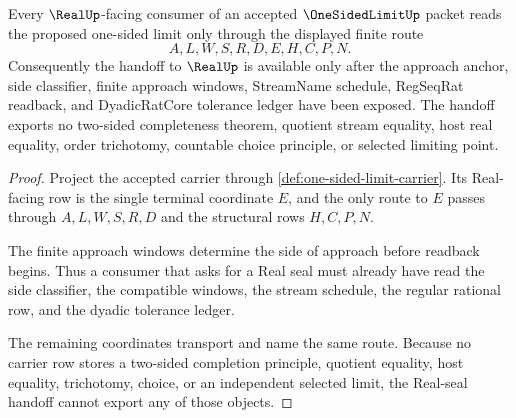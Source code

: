 \begin{theorem}\label{thm:one-sided-limit-realseal-handoff}
Every $\RealUp$-facing consumer of an accepted $\OneSidedLimitUp$ packet reads the proposed one-sided limit only through the displayed finite route
$$
A,L,W,S,R,D,E,H,C,P,N .
$$
Consequently the handoff to $\RealUp$ is available only after the approach anchor, side classifier, finite approach windows, StreamName schedule, RegSeqRat readback, and DyadicRatCore tolerance ledger have been exposed. The handoff exports no two-sided completeness theorem, quotient stream equality, host real equality, order trichotomy, countable choice principle, or selected limiting point.
\end{theorem}
\begin{proof}
Project the accepted carrier through \autoref{def:one-sided-limit-carrier}. Its Real-facing row is the single terminal coordinate $E$, and the only route to $E$ passes through $A,L,W,S,R,D$ and the structural rows $H,C,P,N$.

The finite approach windows determine the side of approach before readback begins. Thus a consumer that asks for a Real seal must already have read the side classifier, the compatible windows, the stream schedule, the regular rational row, and the dyadic tolerance ledger.

The remaining coordinates transport and name the same route. Because no carrier row stores a two-sided completion principle, quotient equality, host equality, trichotomy, choice, or an independent selected limit, the Real-seal handoff cannot export any of those objects.
\end{proof}




